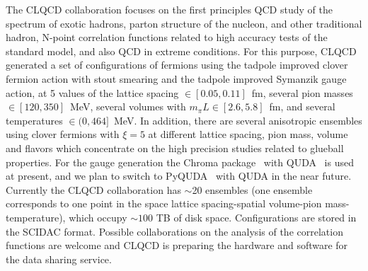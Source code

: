 \documentclass[a4paper,11pt]{article}
\begin{document}
The CLQCD collaboration focuses on the first principles QCD study of
the spectrum of exotic hadrons, parton structure of the nucleon, and
other traditional hadron, N-point correlation functions related to
high accuracy tests of the standard model, and also QCD in extreme
conditions. For this purpose, CLQCD generated a set of configurations
of  fermions using the tadpole improved clover fermion action
with stout smearing and the tadpole improved Symanzik gauge action, at
5 values of the lattice spacing $\in[0.05,0.11]$~fm, several pion
masses $\in[120, 350]$~MeV, several volumes with
$m_{\pi}L\in[2.6,5.8]$~fm, and several temperatures
$\in(0,464]$~MeV. In addition, there are several anisotropic ensembles
  using clover fermions with $\xi=5$ at different lattice spacing,
  pion mass, volume and flavors which concentrate on the high
  precision studies related to glueball properties. For the gauge
  generation the Chroma package~\cite{Edwards:2004sx} with
  QUDA~\cite{Clark:2009wm,Babich:2011np,Clark:2016rdz} is used at
  present, and we plan to switch to PyQUDA~\cite{Jiang:2024lto} with
  QUDA in the near future. Currently the CLQCD collaboration has
  $\sim$20 ensembles (one ensemble corresponds to one point in the
  space lattice spacing-spatial volume-pion mass-temperature), which
  occupy $\sim 100$ TB of disk space. Configurations are stored in the
  SCIDAC format. Possible collaborations on the analysis of the
  correlation functions are welcome and CLQCD is preparing the
  hardware and software for the data sharing service.
\end{document}
